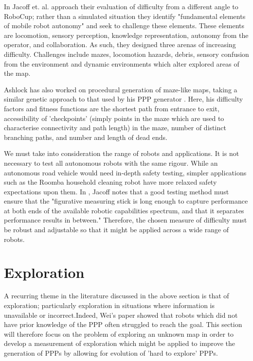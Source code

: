 \documentclass[authoryearcitations]{UoYCSproject}
\begin{document}
In \cite{jacoff} Jacoff et. al. approach their evaluation of difficulty from a different angle to RoboCup; rather than a simulated situation they identify "fundamental elements of mobile robot autonomy" and seek to challenge these elements. These elements are locomotion, sensory perception, knowledge representation, autonomy from the operator, and collaboration. As such, they designed three arenas of increasing difficulty. Challenges include mazes, locomotion hazards, debris, sensory confusion from the environment and dynamic environments which alter explored areas of the map.

Ashlock has also worked on procedural generation of maze-like maps, taking a similar genetic approach to that used by his PPP generator \cite{maze}. Here, his difficulty factors and fitness functions are the shortest path from entrance to exit, accessibility of 'checkpoints' (simply points in the maze which are used to characterise connectivity and path length) in the maze, number of distinct branching paths, and number and length of dead ends.

We must take into consideration the range of robots and applications. It is not necessary to test all autonomous robots with the same rigour. While an autonomous road vehicle would need in-depth safety testing, simpler applications such as the Roomba household cleaning robot have more relaxed safety expectations upon them. In  \cite{jacoffGuide}, Jacoff notes that a good testing method must ensure that the "figurative measuring stick is long enough to capture performance at both ends of the available robotic capabilities spectrum, and that it separates performance results in between." Therefore, the chosen measure of difficulty must be robust and adjustable so that it might be applied across a wide range of robots.

\section{Exploration}
\label{sec:lit4}
A recurring theme in the literature discussed in the above section is that of exploration; particularly exploration in situations where information is unavailable or incorrect.Indeed, Wei's paper showed that robots which did not have prior knowledge of the PPP often struggled to reach the goal. This section will therefore focus on the problem of exploring an unknown map in order to develop a measurement of exploration which might be applied to improve the generation of PPPs by allowing for evolution of 'hard to explore' PPPs.
\end{document}
